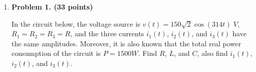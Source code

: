 \begin{enumerate}

\item {\bf Problem 1. (33 points)} 

  In the circuit below, the voltage source is $v(t)=150\sqrt{2}\cos (314 t)\;V$,
  $R_1=R_2=R_3=R$, and the three currents $i_1(t)$, $i_2(t)$, and $i_3(t)$ have
  the same amplitudes. Moreover, it is also known that the total real power
  consumption of the circuit is $P=1500 W$. Find $R$, $L$, and $C$, also find
  $i_1(t)$, $i_2(t)$, and $i_3(t)$.


  \begin{comment}
  {\bf Solution:}

  Represent voltage source $v(t)$ by phasor $\dot{V}=150\angle 0$, and the voltage 
  across the parallel branches (RC and RL) by $\dot{V}_1$, also represent the currents
  by $\dot{I}_1$, $\dot{I}_2=\dot{I}_{RL}$, $\dot{I}_3=\dot{I}_{RC}$. 

  As $|\dot{I}_2|=|\dot{I}_3|$, we have 
  \[ 
  |Z_{RC}|=\bigg|R_3-\frac{j}{\omega C}\bigg|=|Z_{RL}|=|R_2+j\omega L|
  \]
  But also as $R_2=R_3$, we have $\omega L=1/\omega C=X$, i.e., 
  $Z^*_{RL}=(R+jX)^*=R-jX=Z_{RC}$, and 
  \[
  Z_{RC}||Z_{RL}=\frac{Z_{RC}Z_{RL}}{Z_{RC}+Z_{RL}}=\frac{(R+jX)(R-jX)}{R+jX+R-jX}
  =\frac{R^2+X^2}{2R}
  \]
  is real, therefore $i_1(t)$ is in phase with $v(t)$. 

  Since $\dot{I}_1=\dot{I}_2+\dot{I}_3$, and $|\dot{I}_1|=|\dot{I}_2|=|\dot{I}_3|$,
  we know they form an equilateral triangle, i.e., 
  \[ 
  \left\{ \begin{array}{ll}
    \dot{I}_1=\dot{I}_R=I \angle 0^\circ & \mbox{($\dot{I}_1$ thru $R_1$ in phase with $\dot{V}=150\angle 0^\circ $)}\\
    \dot{I}_2=\dot{I}_{RL}=I \angle -60^\circ & \mbox{($\dot{I}_2$ thru $L$ lagging $\dot{V}_1$)}\\
    \dot{I}_3=\dot{I}_{RC}=I \angle  60^\circ & \mbox{($\dot{I}_3$ thru $C$ leading $\dot{V}_1$)}
  \end{array} \right. 
  \]
  Since $\dot{I}_1$ is in phase with $\dot{V}=150\angle 0^\circ$, we have
  \[
  |\dot{I}_1|=\frac{P}{V}=\frac{1500}{150}=10A =|\dot{I}_2|=|\dot{I}_3|
  \]
  and we get
  \[
  i_1(t)=10\times 1.414 \cos(314t),\;\;\;\;
  i_2(t)=10\times 1.414 \cos(314t-\pi/3),\;\;\;\;
  i_1(t)=10\times 1.414 \cos(314t+\pi/3)
  \]
  Also as only the three resistors $R_1=R_2=R_3$ consume real power, they each consume 
  $P/3=500W$ and 
  \[
  R_1=R_2=R_3=\frac{P}{I^2}=\frac{500}{10^2}=5\Omega 
  \]
  Then we also get
  \[
  V_1=V-RI=150-5\times 10=150 V 
  \]
  and
  \[
  |Z_{RL}|=\frac{|\dot{V}_1|}{|\dot{I}_2|}=|Z_{RC}|=\frac{|\dot{V}_1|}{|\dot{I}_3|}
  =\frac{150}{5}=30
  \]
  i.e.,
  \[
  |Z_{RL}|=\sqrt{R^2+(\omega L)^2},\;\;\;\;\;
  |Z_{RC}|=\sqrt{R^2+(1/\omega C)^2}
  \]
  Solving these (with $\omega=314$) we get
  \[
  L=0.0942\,H, \;\;\;\;\;C=107.66\,\mu F 
  \]
  We can verify that the frequency $\omega=314$ is indeed the resonant frequency:
  \[
  \omega_0=\frac{1}{LC}=\frac{1}{0.0942\times 107.66\times 10^-6}=314
  \]
  \end{comment}



\end{enumerate}
